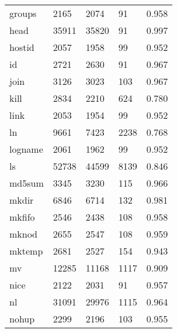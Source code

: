 \begin{longtable}{lp{4.5cm}p{4.5cm}p{4.5cm}p{4.5cm}}
groups    &                     2165 &         2074 &            91 &                    0.958 \\
head      &                    35911 &        35820 &            91 &                    0.997 \\
hostid    &                     2057 &         1958 &            99 &                    0.952 \\
id        &                     2721 &         2630 &            91 &                    0.967 \\
join      &                     3126 &         3023 &           103 &                    0.967 \\
kill      &                     2834 &         2210 &           624 &                    0.780 \\
link      &                     2053 &         1954 &            99 &                    0.952 \\
ln        &                     9661 &         7423 &          2238 &                    0.768 \\
logname   &                     2061 &         1962 &            99 &                    0.952 \\
ls        &                    52738 &        44599 &          8139 &                    0.846 \\
md5sum    &                     3345 &         3230 &           115 &                    0.966 \\
mkdir     &                     6846 &         6714 &           132 &                    0.981 \\
mkfifo    &                     2546 &         2438 &           108 &                    0.958 \\
mknod     &                     2655 &         2547 &           108 &                    0.959 \\
mktemp    &                     2681 &         2527 &           154 &                    0.943 \\
mv        &                    12285 &        11168 &          1117 &                    0.909 \\
nice      &                     2122 &         2031 &            91 &                    0.957 \\
nl        &                    31091 &        29976 &          1115 &                    0.964 \\
nohup     &                     2299 &         2196 &           103 &                    0.955 \\

\end{longtable}
